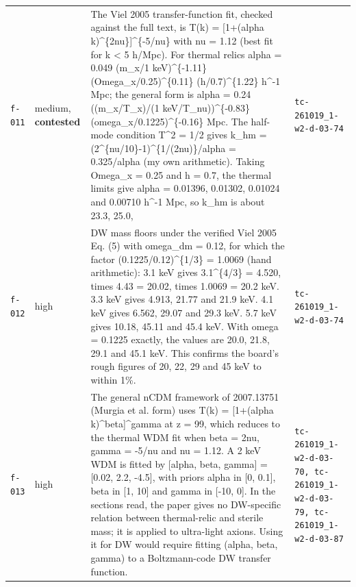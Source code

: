 \documentclass[11pt,a4paper]{article}
\begin{document}
\begin{longtable}{@{}p{}p{}p{}p{}@{}}
\texttt{f-011} & medium, \textbf{contested} & The Viel 2005 transfer-function fit, checked against the full text, is T(k) = [1+(alpha k)\textasciicircum{}\{2nu\}]\textasciicircum{}\{-5/nu\} with nu = 1.12 (best fit for k \textless{} 5 h/Mpc). For thermal relics alpha = 0.049 (m\_x/1 keV)\textasciicircum{}\{-1.11\} (Omega\_x/0.25)\textasciicircum{}\{0.11\} (h/0.7)\textasciicircum{}\{1.22\} h\textasciicircum{}-1 Mpc; the general form is alpha = 0.24 ((m\_x/T\_x)/(1 keV/T\_nu))\textasciicircum{}\{-0.83\} (omega\_x/0.1225)\textasciicircum{}\{-0.16\} Mpc. The half-mode condition T\textasciicircum{}2 = 1/2 gives k\_hm = (2\textasciicircum{}\{nu/10\}-1)\textasciicircum{}\{1/(2nu)\}/alpha = 0.325/alpha (my own arithmetic). Taking Omega\_x = 0.25 and h = 0.7, the thermal limits give alpha = 0.01396, 0.01302, 0.01024 and 0.00710 h\textasciicircum{}-1 Mpc, so k\_hm is about 23.3, 25.0, & \texttt{tc-261019\_\allowbreak{}1-w2-d-03-74} \\
\texttt{f-012} & high & DW mass floors under the verified Viel 2005 Eq. (5) with omega\_dm = 0.12, for which the factor (0.1225/0.12)\textasciicircum{}\{1/3\} = 1.0069 (hand arithmetic): 3.1 keV gives 3.1\textasciicircum{}\{4/3\} = 4.520, times 4.43 = 20.02, times 1.0069 = 20.2 keV. 3.3 keV gives 4.913, 21.77 and 21.9 keV. 4.1 keV gives 6.562, 29.07 and 29.3 keV. 5.7 keV gives 10.18, 45.11 and 45.4 keV. With omega = 0.1225 exactly, the values are 20.0, 21.8, 29.1 and 45.1 keV. This confirms the board's rough figures of 20, 22, 29 and 45 keV to within 1\%. & \texttt{tc-261019\_\allowbreak{}1-w2-d-03-74} \\
\texttt{f-013} & high & The general nCDM framework of 2007.13751 (Murgia et al. form) uses T(k) = [1+(alpha k)\textasciicircum{}beta]\textasciicircum{}gamma at z = 99, which reduces to the thermal WDM fit when beta = 2nu, gamma = -5/nu and nu = 1.12. A 2 keV WDM is fitted by [alpha, beta, gamma] = [0.02, 2.2, -4.5], with priors alpha in [0, 0.1], beta in [1, 10] and gamma in [-10, 0]. In the sections read, the paper gives no DW-specific relation between thermal-relic and sterile mass; it is applied to ultra-light axions. Using it for DW would require fitting (alpha, beta, gamma) to a Boltzmann-code DW transfer function. & \texttt{tc-261019\_\allowbreak{}1-w2-d-03-70,\allowbreak{} tc-261019\_\allowbreak{}1-w2-d-03-79,\allowbreak{} tc-261019\_\allowbreak{}1-w2-d-03-87} \\

\end{longtable}
\end{document}

